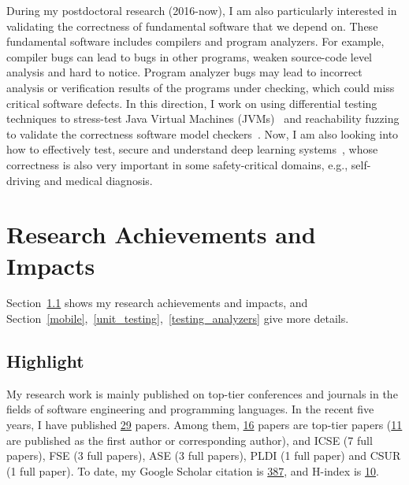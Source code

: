 \documentclass[a4paper]{article}
\begin{document}
During my postdoctoral research (2016-now), I am also particularly interested in validating the correctness of fundamental software that we depend on. These fundamental software includes compilers and program analyzers. For example, compiler bugs can lead to bugs in other programs, weaken source-code level analysis and hard to notice. Program analyzer bugs may lead to incorrect analysis or verification results of the programs under checking, which could miss critical software defects. In this direction, I work on using differential testing techniques to stress-test Java Virtual Machines (JVMs)~\cite{classfuzz,classming} and reachability fuzzing to validate the correctness software model checkers~\cite{mcfuzz}. Now, I am also looking into how to effectively test, secure and understand deep learning systems~\cite{deepguage}, whose correctness is also very important in some safety-critical domains, e.g., self-driving and medical diagnosis.


\section{Research Achievements and Impacts}

Section~\ref{highlight} shows my research achievements and impacts, and Section~\ref{mobile},~\ref{unit_testing},~\ref{testing_analyzers} give more details.

\subsection{Highlight}
\label{highlight}

My research work is mainly published on top-tier conferences and journals in the fields of software engineering and programming languages. In the recent five years, I have published \underline{29} papers. Among them, \underline{16} papers are top-tier papers (\underline{11} are published as the first author or corresponding author), and ICSE (7 full papers), FSE (3 full papers), ASE (3 full papers), PLDI (1 full paper) and CSUR (1 full paper). To date, my Google Scholar citation is \underline{387}, and H-index is \underline{10}.
\end{document}
